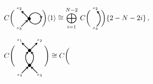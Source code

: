 \documentclass{compositio}
\theoremstyle{definition}
\numberwithin{equation}{section}
\begin{document}
\begin{align}
\label{MOYcatDecomp1}&
C \bigg( 
\begin{tikzpicture}[scale=0.5,baseline=-2pt, inner sep=1mm, >=stealth]
\node (x2) at (-1,1) [circle,inner sep=1.5pt, draw=white,fill= white] {{\tiny $x_{2}$}};
\node (x3) at (-1,-1) [circle,inner sep=1.5pt, draw=white,fill= white] {{\tiny $x_{3}$}};
\node (centre) at (0,0.75) [circle] {};
\node (bl) at (-1,-1) [circle] {};
\node (br) at (1,-1) [circle] {};
\node (tl) at (-1,1) [circle] {};
\node (r) at (1,0) [circle] {};
\node (0) at (0,0) [circle,inner sep=1.5pt, thin,draw=black,fill= black] {};
\draw[->,  thick] (bl) -- (0); 
\draw[->,  thick] (0) -- (tl); 
\draw[ ->, thick, shift={(0.6,0)} ]  (175:0.6) arc (175:0:0.6); 
\draw[ -, thick, shift={(-0.6,0)} ]  (0:0.6) arc (-175:0:0.6); 
\end{tikzpicture} 
\bigg)
\langle 1\rangle
\cong
\bigoplus_{i=1}^{N-2} \,
C \bigg( 
\begin{tikzpicture}[scale=0.5,baseline=-2pt, inner sep=1mm, >=stealth]
\node (x2) at (0.5,1) [circle,inner sep=1.5pt, draw=white,fill= white] {{\tiny $x_{2}$}};
\node (x3) at (0.5,-1) [circle,inner sep=1.5pt, draw=white,fill= white] {{\tiny $x_{3}$}};
\draw[ ->, thick ]  (-50:1) arc (-50:50:1); 
\end{tikzpicture}
\bigg)
\{ 2-N-2i\} \, ,
\\
\label{MOYcatDecomp2}&
C \Bigg( 
\begin{tikzpicture}[scale=0.5,baseline=(centre.base), inner sep=1mm, >=stealth]
\node (x1) at (-1,2.5) [circle,inner sep=1.5pt, draw=white,fill= white] {{\tiny $x_{1}$}};
\node (x2) at (1,2.5) [circle,inner sep=1.5pt, draw=white,fill= white] {{\tiny $x_{2}$}};
\node (x3) at (1,-1) [circle,inner sep=1.5pt, draw=white,fill= white] {{\tiny $x_{3}$}};
\node (x4) at (-1,-1) [circle,inner sep=1.5pt, draw=white,fill= white] {{\tiny $x_{4}$}};
\node (centre) at (0,0.75) [circle] {};
\node (bl) at (-1,-1) [circle] {};
\node (br) at (1,-1) [circle] {};
\node (tl) at (-1,2.5) [circle] {};
\node (tr) at (1,2.5) [circle] {};
\node (0) at (0,0) [circle,inner sep=1.5pt, thin,draw=black,fill= black] {};
\node (02) at (0,1.5) [circle,inner sep=1.5pt, thin,draw=black,fill= black] {};
\draw[->,  thick] (bl) -- (0); 
\draw[->,  thick] (br) -- (0); 
\draw[->,  thick] (0) to [out=135,in=225] (02); 
\draw[->,  thick] (0) to [out=45,in=-45] (02); 
\draw[->,  thick] (02) -- (tl); 
\draw[->,  thick] (02) -- (tr); 
\end{tikzpicture} 
\Bigg)
\cong
C \bigg( 
\begin{tikzpicture}[scale=0.5,baseline=-2pt, inner sep=1mm, >=stealth]

\end{tikzpicture}
\end{align}
\end{document}
